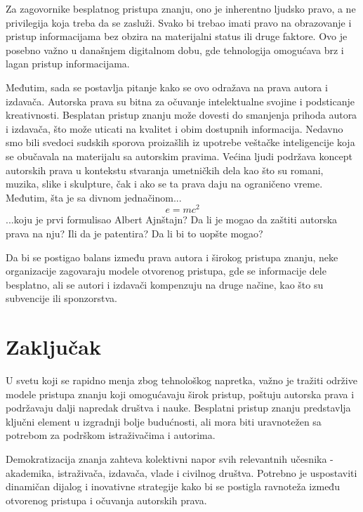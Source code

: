 \documentclass{article}
\begin{document}
Za zagovornike besplatnog pristupa znanju, ono je inherentno ljudsko pravo, a ne privilegija koja treba da se zasluži. Svako bi trebao imati pravo na obrazovanje i pristup informacijama bez obzira na materijalni status ili druge faktore. Ovo je posebno važno u današnjem digitalnom dobu, gde tehnologija omogućava brz i lagan pristup informacijama. 

Međutim, sada se postavlja pitanje kako se ovo odražava na prava autora i izdavača. Autorska prava su bitna za očuvanje intelektualne svojine i podsticanje kreativnosti. Besplatan pristup znanju može dovesti do smanjenja prihoda autora i izdavača, što može uticati na kvalitet i obim dostupnih informacija. Nedavno smo bili svedoci sudskih sporova proizašlih iz upotrebe veštačke inteligencije koja se obučavala na materijalu sa autorskim pravima. Većina ljudi podržava koncept autorskih prava u kontekstu stvaranja umetničkih dela kao što su romani, muzika, slike i skulpture, čak i ako se ta prava daju na ograničeno vreme. Međutim, šta je sa divnom jednačinom...
\begin{equation*}
e = mc^2
\end{equation*}
...koju je prvi formulisao Albert Ajnštajn? Da li je mogao da zaštiti autorska prava na nju? Ili da je patentira? Da li bi to uopšte mogao?

Da bi se postigao balans između prava autora i širokog pristupa znanju, neke organizacije zagovaraju modele otvorenog pristupa, gde se informacije dele besplatno, ali se autori i izdavači kompenzuju na druge načine, kao što su subvencije ili sponzorstva.


\section{Zaključak}

U svetu koji se rapidno menja zbog tehnološkog napretka, važno je tražiti održive modele pristupa znanju koji omogućavaju širok pristup, poštuju autorska prava i podržavaju dalji napredak društva i nauke. Besplatni pristup znanju predstavlja ključni element u izgradnji bolje budućnosti, ali mora biti uravnotežen sa potrebom za podrškom istraživačima i autorima.

Demokratizacija znanja zahteva kolektivni napor svih relevantnih učesnika - akademika, istraživača, izdavača, vlade i civilnog društva. Potrebno je uspostaviti dinamičan dijalog i inovativne strategije kako bi se postigla ravnoteža između otvorenog pristupa i očuvanja autorskih prava. 
\end{document}
